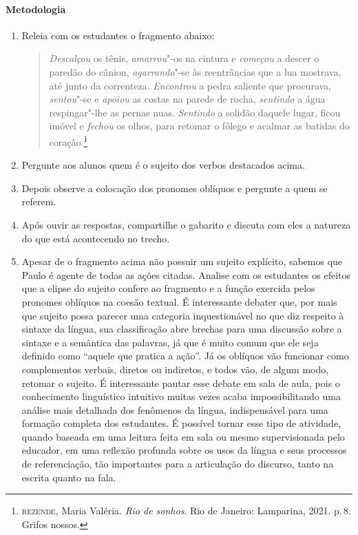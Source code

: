 \documentclass[12pt]{extarticle}
\begin{document}
\paragraph{Metodologia}
\begin{enumerate}
\item Releia com os estudantes o fragmento abaixo:

\begin{quote}
\emph{Descalçou} os tênis, \emph{amarrou}"-os na cintura e
\emph{começou} a descer o paredão do cânion, \emph{agarrando}"-se às
reentrâncias que a lua mostrava, até junto da correnteza.
\emph{Encontrou} a pedra saliente que procurava, \emph{sentou}"-se e
\emph{apoiou} as costas na parede de rocha, \emph{sentindo} a água
respingar"-lhe as pernas nuas. \emph{Sentindo} a solidão daquele
lugar, ficou imóvel e \emph{fechou} os olhos, para retomar o fôlego
e acalmar as batidas do coração.\footnote{\textsc{rezende}, Maria Valéria. \emph{Rio de sonhos}. Rio de Janeiro: Lamparina, 2021. p.\,8. Grifos nossos.}
\end{quote}

\item Pergunte aos alunos quem é o sujeito dos verbos destacados acima.

\item Depois observe a colocação dos pronomes oblíquos e pergunte a quem se referem.

\item Após ouvir as respostas, compartilhe o gabarito e discuta com eles a natureza do que está acontecendo no trecho.

\item Apesar de o fragmento acima não possuir um sujeito explícito, sabemos
que Paulo é agente de todas as ações citadas. Analise com os
estudantes os efeitos que a elipse do sujeito confere ao fragmento e a
função exercida pelos pronomes oblíquos na coesão textual. É
interessante debater que, por mais que sujeito possa parecer uma
categoria inquestionável no que diz respeito à sintaxe da língua, sua
classificação abre brechas para uma discussão sobre a sintaxe e a
semântica das palavras, já que é muito comum que ele seja definido
como ``aquele que pratica a ação''. Já os oblíquos vão funcionar como
complementos verbais, diretos ou indiretos, e todos vão, de algum
modo, retomar o sujeito. É interessante pautar esse debate em sala de
aula, pois o conhecimento linguístico intuitivo muitas vezes acaba
impossibilitando uma análise mais detalhada dos fenômenos da língua,
indispensável para uma formação completa dos estudantes. É possível
tornar esse tipo de atividade, quando baseada em uma leitura feita em
sala ou mesmo supervisionada pelo educador, em uma reflexão profunda
sobre os usos da língua e seus processos de referenciação, tão
importantes para a articulação do discurso, tanto na escrita quanto na
fala.
\end{enumerate}
\end{document}
